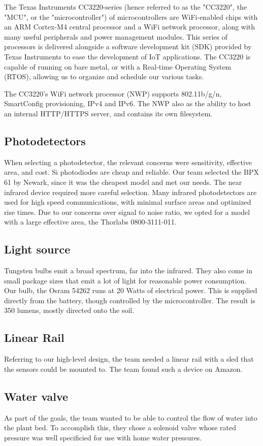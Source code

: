 \documentclass[journal]{IEEEtran}
\begin{document}
The Texas Instruments CC3220-series (hence referred to as the "CC3220", the "MCU", or the "microcontroller") of microcontrollers are WiFi-enabled chips with an ARM Cortex-M4 central processor and a WiFi network processor, along with many useful peripherals and power management modules. This series of processors is delivered alongside a software development kit (SDK) provided by Texas Instruments to ease the development of IoT applications. The CC3220 is capable of running on bare metal, or with a Real-time Operating System (RTOS), allowing us to organize and schedule our various tasks.

The CC3220's WiFi network processor (NWP) supports 802.11b/g/n, SmartConfig provisioning, IPv4 and IPv6. The NWP also as the ability to host an internal HTTP/HTTPS server, and contains its own filesystem.
\subsection{Photodetectors}
When selecting a photodetector, the relevant concerns were sensitivity, effective area, and cost. Si photodiodes are cheap and reliable. Our team selected the BPX 61 by Newark, since it was the cheapest model and met our needs. The near infrared device required more careful selection. Many infrared photodetectors are used for high speed communications, with minimal surface areas and optimized rise times. Due to our concerns over signal to noise ratio, we opted for a model with a large effective area, the Thorlabs 0800-3111-011.
\subsection{Light source}
Tungsten bulbs emit a broad spectrum, far into the infrared. They also come in small package sizes that emit a lot of light for reasonable power consumption. Our bulb, the Osram 54262 runs at 20 Watts of electrical power. This is supplied directly from the battery, though controlled by the microcontroller. The result is 350 lumens, mostly directed onto the soil.
\subsection{Linear Rail}
Referring to our high-level design, the team needed a linear rail with a sled that the sensors could be mounted to. The team found such a device on Amazon.
\subsection{Water valve}
As part of the goals, the team wanted to be able to control the flow of water into the plant bed. To accomplish this, they chose a solenoid valve whose rated pressure was well specificied for use with home water pressures.
\end{document}
